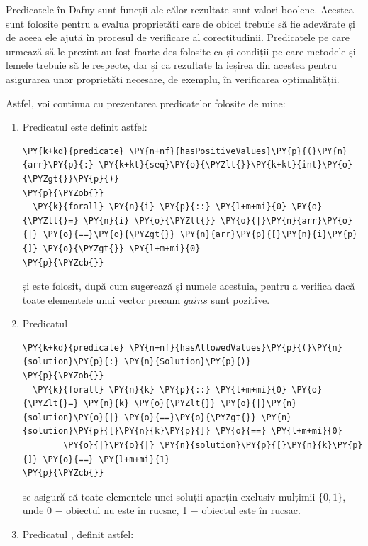 \begin{sloppypar}
Predicatele în Dafny sunt funcții ale călor rezultate sunt valori boolene. Acestea sunt folosite pentru a evalua proprietăți care de obicei trebuie să fie adevărate și de aceea ele ajută în procesul de verificare al corectitudinii. Predicatele pe care urmează să le prezint au fost foarte des folosite ca și condiții pe care metodele și lemele trebuie să le respecte, dar și ca rezultate la ieșirea din acestea pentru asigurarea unor proprietăți necesare, de exemplu, în verificarea optimalității. \par
Astfel, voi continua cu prezentarea predicatelor folosite de mine:
\begin{enumerate}
    \item Predicatul  este definit astfel:
    \begin{Verbatim}[commandchars=\\\{\}]
\PY{k+kd}{predicate} \PY{n+nf}{hasPositiveValues}\PY{p}{(}\PY{n}{arr}\PY{p}{:} \PY{k+kt}{seq}\PY{o}{\PYZlt{}}\PY{k+kt}{int}\PY{o}{\PYZgt{}}\PY{p}{)}
\PY{p}{\PYZob{}}
  \PY{k}{forall} \PY{n}{i} \PY{p}{::} \PY{l+m+mi}{0} \PY{o}{\PYZlt{}=} \PY{n}{i} \PY{o}{\PYZlt{}} \PY{o}{|}\PY{n}{arr}\PY{o}{|} \PY{o}{==}\PY{o}{\PYZgt{}} \PY{n}{arr}\PY{p}{[}\PY{n}{i}\PY{p}{]} \PY{o}{\PYZgt{}} \PY{l+m+mi}{0}
\PY{p}{\PYZcb{}}
\end{Verbatim}
    și este folosit, după cum sugerează și numele acestuia, pentru a verifica dacă toate elementele unui vector precum $gains$ sunt pozitive.
    \item Predicatul 
    \begin{Verbatim}[commandchars=\\\{\}]
\PY{k+kd}{predicate} \PY{n+nf}{hasAllowedValues}\PY{p}{(}\PY{n}{solution}\PY{p}{:} \PY{n}{Solution}\PY{p}{)}
\PY{p}{\PYZob{}}
  \PY{k}{forall} \PY{n}{k} \PY{p}{::} \PY{l+m+mi}{0} \PY{o}{\PYZlt{}=} \PY{n}{k} \PY{o}{\PYZlt{}} \PY{o}{|}\PY{n}{solution}\PY{o}{|} \PY{o}{==}\PY{o}{\PYZgt{}} \PY{n}{solution}\PY{p}{[}\PY{n}{k}\PY{p}{]} \PY{o}{==} \PY{l+m+mi}{0} 
        \PY{o}{|}\PY{o}{|} \PY{n}{solution}\PY{p}{[}\PY{n}{k}\PY{p}{]} \PY{o}{==} \PY{l+m+mi}{1}
\PY{p}{\PYZcb{}}
\end{Verbatim}
    se asigură că toate elementele unei soluții aparțin exclusiv mulțimii $\{0, 1\}$, unde 0 \(-\) obiectul nu este în rucsac, 1 \(-\) obiectul este în rucsac.
    \item Predicatul , definit astfel:
    \begin{Verbatim}[commandchars=\\\{\}]

\end{Verbatim}
\end{enumerate}
\end{sloppypar}
